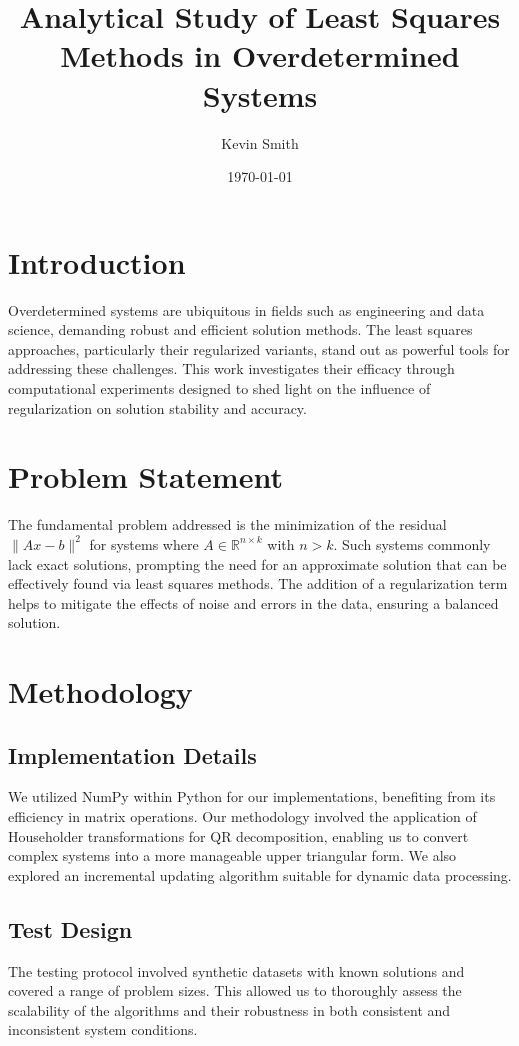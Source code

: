 \documentclass{article}
\title{\textbf{Analytical Study of Least Squares Methods in Overdetermined Systems}}
\author{Kevin Smith}
\date{\today}
\begin{document}
\maketitle


\section{Introduction}
Overdetermined systems are ubiquitous in fields such as engineering and data science, demanding robust and efficient solution methods. The least squares approaches, particularly their regularized variants, stand out as powerful tools for addressing these challenges. This work investigates their efficacy through computational experiments designed to shed light on the influence of regularization on solution stability and accuracy.

\section{Problem Statement}
The fundamental problem addressed is the minimization of the residual $\|Ax - b\|^2$ for systems where $A \in \mathbb{R}^{n \times k}$ with $n > k$. Such systems commonly lack exact solutions, prompting the need for an approximate solution that can be effectively found via least squares methods. The addition of a regularization term helps to mitigate the effects of noise and errors in the data, ensuring a balanced solution.

\section{Methodology}
\subsection{Implementation Details}
We utilized NumPy within Python for our implementations, benefiting from its efficiency in matrix operations. Our methodology involved the application of Householder transformations for QR decomposition, enabling us to convert complex systems into a more manageable upper triangular form. We also explored an incremental updating algorithm suitable for dynamic data processing.

\subsection{Test Design}
The testing protocol involved synthetic datasets with known solutions and covered a range of problem sizes. This allowed us to thoroughly assess the scalability of the algorithms and their robustness in both consistent and inconsistent system conditions.
\end{document}
